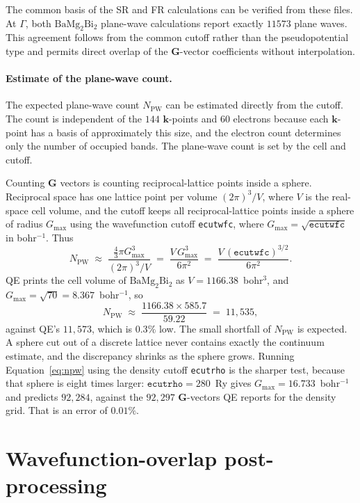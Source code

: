 \documentclass[11pt]{article}
\newcommand{\kk}{\mathbf{k}}
\newcommand{\GG}{\mathbf{G}}
\newcommand{\bmb}{\mathrm{BaMg_2Bi_2}}
\begin{document}
The common basis of the SR and FR calculations can be verified from these files. At
$\Gamma$, both $\bmb$ plane-wave calculations report exactly $11573$ plane waves. This agreement
follows from the common cutoff rather than the pseudopotential type and permits direct overlap of the
$\GG$-vector coefficients without interpolation.

\paragraph{Estimate of the plane-wave count.} The expected plane-wave count $N_{\mathrm{PW}}$ can be
estimated directly from the cutoff. The count is independent of the $144$ $\kk$-points and $60$
electrons because each $\kk$-point has a basis of approximately this size, and the electron count
determines only the number of occupied bands. The plane-wave count is set by the cell and cutoff.

Counting $\GG$ vectors is counting reciprocal-lattice points inside a sphere. Reciprocal space has one
lattice point per volume $(2\pi)^3/V$, where $V$ is the real-space cell volume, and the cutoff keeps
all reciprocal-lattice points inside a sphere of radius $G_{\max}$ using the wavefunction cutoff
\texttt{ecutwfc}, where $G_{\max}=\sqrt{\texttt{ecutwfc}}$ in bohr$^{-1}$. Thus
\begin{equation}
  N_{\text{PW}} \;\approx\; \frac{\tfrac{4}{3}\pi G_{\max}^{3}}{(2\pi)^{3}/V}
  \;=\; \frac{V\,G_{\max}^{3}}{6\pi^{2}}
  \;=\; \frac{V\,(\texttt{ecutwfc})^{3/2}}{6\pi^{2}}.
  \label{eq:npw}
\end{equation}
QE prints the cell volume of $\bmb$ as $V=1166.38$~bohr$^3$, and
$G_{\max}=\sqrt{70}=8.367$~bohr$^{-1}$, so
\[
  N_{\text{PW}} \;\approx\; \frac{1166.38 \times 585.7}{59.22} \;=\; 11{,}535,
\]
against QE's $11{,}573$, which is $0.3\%$ low. The small shortfall of $N_{\mathrm{PW}}$ is expected.
A sphere cut out of a discrete lattice never contains exactly the continuum estimate, and the
discrepancy shrinks as the sphere grows. Running Equation~\eqref{eq:npw} using the density cutoff
\texttt{ecutrho} is the sharper test, because that sphere is eight times larger:
$\texttt{ecutrho}=280$~Ry gives $G_{\max}=16.733$~bohr$^{-1}$ and predicts $92{,}284$, against the
$92{,}297$ $\GG$-vectors QE reports for the density grid. That is an
error of $0.01\%$.

\section{Wavefunction-overlap post-processing}\label{sec:post}
\end{document}
